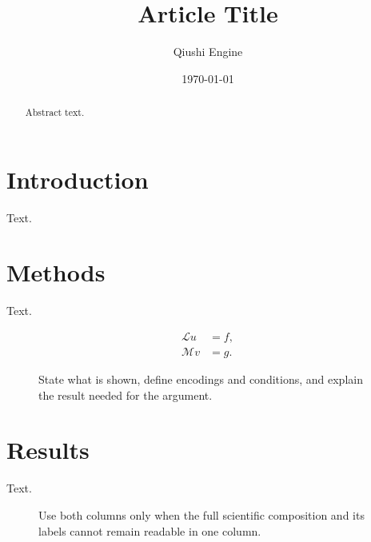 \documentclass[aps,prl,reprint,superscriptaddress,nofootinbib,longbibliography]{revtex4-2}
\theoremstyle{definition}
\theoremstyle{remark}
\begin{document}
\title{Article Title}

\author{Qiushi Engine}
\noaffiliation

\date{\today}

\begin{abstract}
Abstract text.
\end{abstract}

\maketitle

\section{Introduction}

Text.

\section{Methods}

Text.

\begin{equation}
  \begin{aligned}
    \mathcal{L}u &= f, \\
    \mathcal{M}v &= g .
  \end{aligned}
  \label{eq:column-example}
\end{equation}

\begin{figure}[t]
  \centering
  \fbox{\rule{0pt}{1.25in}\rule{0.88\columnwidth}{0pt}}
  \caption{State what is shown, define encodings and conditions, and explain the
  result needed for the argument.\label{fig:single-column}}
\end{figure}

\section{Results}

Text.

\begin{figure}[t]
  \centering
  \fbox{\rule{0pt}{1.55in}\rule{0.96\textwidth}{0pt}}
  \caption{Use both columns only when the full scientific composition and its
  labels cannot remain readable in one column.\label{fig:two-column}}
\end{figure}
\end{document}

